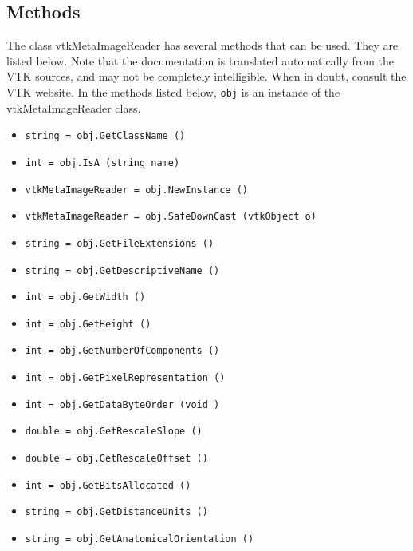 \subsection{Methods}

The class vtkMetaImageReader has several methods that can be used.
  They are listed below.
Note that the documentation is translated automatically from the VTK sources,
and may not be completely intelligible.  When in doubt, consult the VTK website.
In the methods listed below, \verb|obj| is an instance of the vtkMetaImageReader class.
\begin{itemize}
\item  \verb|string = obj.GetClassName ()|

\item  \verb|int = obj.IsA (string name)|

\item  \verb|vtkMetaImageReader = obj.NewInstance ()|

\item  \verb|vtkMetaImageReader = obj.SafeDownCast (vtkObject o)|

\item  \verb|string = obj.GetFileExtensions ()|

\item  \verb|string = obj.GetDescriptiveName ()|

\item  \verb|int = obj.GetWidth ()|

\item  \verb|int = obj.GetHeight ()|

\item  \verb|int = obj.GetNumberOfComponents ()|

\item  \verb|int = obj.GetPixelRepresentation ()|

\item  \verb|int = obj.GetDataByteOrder (void )|

\item  \verb|double = obj.GetRescaleSlope ()|

\item  \verb|double = obj.GetRescaleOffset ()|

\item  \verb|int = obj.GetBitsAllocated ()|

\item  \verb|string = obj.GetDistanceUnits ()|

\item  \verb|string = obj.GetAnatomicalOrientation ()|


\end{itemize}
